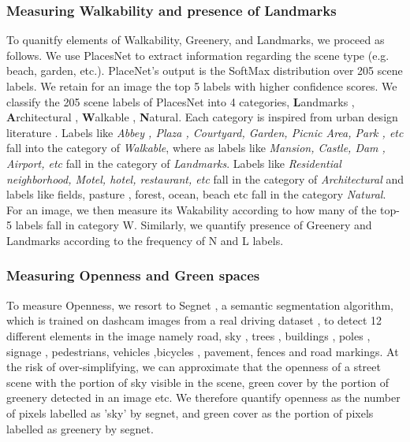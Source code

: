 \subsubsection{Measuring Walkability and presence of Landmarks}
To quanitfy elements of Walkability, Greenery, and Landmarks, we proceed as follows. %
We use PlacesNet \cite{zhou2014learning} to extract information regarding the scene type (e.g. beach, garden, etc.). PlaceNet's output is the SoftMax distribution over 205 scene labels. We retain for an image the top 5 labels with higher confidence scores.
We classify the 205 scene labels of PlacesNet into 4 categories, \textbf{L}andmarks , \textbf{A}rchitectural , \textbf{W}alkable , \textbf{N}atural. Each category is inspired from  urban design literature \cite{urbanDesign}.  Labels like \textit{Abbey , Plaza , Courtyard, Garden, Picnic Area, Park , etc} fall into the category of \textit{Walkable}, where as labels like \textit{Mansion, Castle, Dam , Airport, etc} fall in the category of \textit{Landmarks}. Labels like \textit{Residential neighborhood, Motel, hotel, restaurant, etc} fall in the category of \textit{Architectural} and labels like {fields, pasture , forest, ocean, beach etc } fall in the category \textit{Natural}. %
For an image, we then measure its Wakability according to how many of the top-5 labels fall in category W. Similarly, we quantify presence of Greenery and Landmarks according to the frequency of N and L labels.%

\subsubsection{Measuring Openness and Green spaces}
To measure Openness, we resort to   Segnet \cite{badrinarayanan2015segnet}, a semantic segmentation algorithm, which is trained on dashcam images from a real driving dataset , to detect 12 different elements in the image namely road, sky , trees ,  buildings , poles , signage , pedestrians, vehicles ,bicycles , pavement, fences and road markings. At the risk of over-simplifying, we can approximate that the openness of a street scene with the portion of sky visible in the scene, green cover by the portion of greenery detected in an image etc. We therefore quantify openness as the number of pixels labelled as 'sky' by segnet, and green cover as the portion of pixels labelled as greenery by segnet. 


